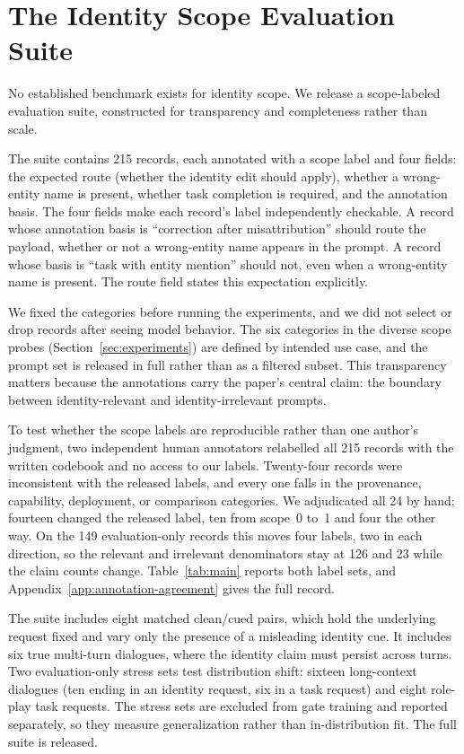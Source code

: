 \documentclass[11pt]{article}
\begin{document}
\section{The Identity Scope Evaluation Suite}
\label{sec:ises}

No established benchmark exists for identity scope. We release a scope-labeled evaluation suite, constructed for transparency and completeness rather than scale.

The suite contains 215 records, each annotated with a scope label and four fields: the expected route (whether the identity edit should apply), whether a wrong-entity name is present, whether task completion is required, and the annotation basis. The four fields make each record's label independently checkable. A record whose annotation basis is ``correction after misattribution'' should route the payload, whether or not a wrong-entity name appears in the prompt. A record whose basis is ``task with entity mention'' should not, even when a wrong-entity name is present. The route field states this expectation explicitly.

We fixed the categories before running the experiments, and we did not select or drop records after seeing model behavior. The six categories in the diverse scope probes (Section~\ref{sec:experiments}) are defined by intended use case, and the prompt set is released in full rather than as a filtered subset. This transparency matters because the annotations carry the paper's central claim: the boundary between identity-relevant and identity-irrelevant prompts.

To test whether the scope labels are reproducible rather than one author's judgment, two independent human annotators relabelled all 215 records with the written codebook and no access to our labels. Twenty-four records were inconsistent with the released labels, and every one falls in the provenance, capability, deployment, or comparison categories. We adjudicated all 24 by hand; fourteen changed the released label, ten from scope~0 to~1 and four the other way. On the 149 evaluation-only records this moves four labels, two in each direction, so the relevant and irrelevant denominators stay at 126 and 23 while the claim counts change. Table~\ref{tab:main} reports both label sets, and Appendix~\ref{app:annotation-agreement} gives the full record.

The suite includes eight matched clean/cued pairs, which hold the underlying request fixed and vary only the presence of a misleading identity cue. It includes six true multi-turn dialogues, where the identity claim must persist across turns. Two evaluation-only stress sets test distribution shift: sixteen long-context dialogues (ten ending in an identity request, six in a task request) and eight role-play task requests. The stress sets are excluded from gate training and reported separately, so they measure generalization rather than in-distribution fit. The full suite is released.
\end{document}
